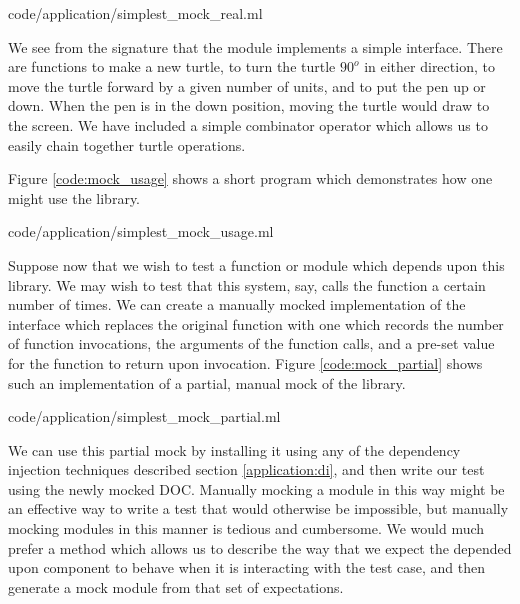  {code/application/simplest_mock_real.ml}

We see from the  signature that the  module
implements a simple interface. There are functions to make a new
turtle, to turn the turtle $90^o$ in either direction, to move the
turtle forward by a given number of units, and to put the pen up or
down. When the pen is in the down position, moving the turtle would
draw to the screen. We have included a simple combinator operator
\code{>>} which allows us to easily chain together turtle operations.

Figure \ref{code:mock_usage} shows a short program which demonstrates
how one might use the  library.

 {code/application/simplest_mock_usage.ml}

Suppose now that we wish to test a function or module which depends
upon this  library. We may wish to test that this system,
say, calls the  function a certain number of times. We can
create a manually mocked implementation of the  interface
which replaces the original  function with one which records
the number of function invocations, the arguments of the function
calls, and a pre-set value for the function to return upon
invocation. Figure \ref{code:mock_partial} shows such an
implementation of a partial, manual mock of the  library.


 {code/application/simplest_mock_partial.ml}

We can use this partial mock by installing it using any of the
dependency injection techniques described section
\ref{application:di}, and then write our test using the newly mocked
DOC. Manually mocking a module in this way might be an effective way
to write a test that would otherwise be impossible, but manually
mocking modules in this manner is tedious and cumbersome. We would much
prefer a method which allows us to describe the way that we expect the
depended upon component to behave when it is interacting with the test
case, and then generate a mock module from that set of expectations.

